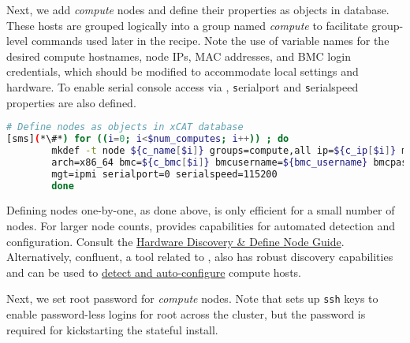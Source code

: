 
\noindent Next, we add {\em compute} nodes and define their properties as
objects in \xCAT{} database.
These hosts are grouped logically into a group named {\em
compute} to facilitate group-level commands used later in the recipe.  Note the
use of variable names for the desired compute hostnames, node IPs, MAC
addresses, and BMC login credentials, which should be modified to accommodate
local settings and hardware. To enable serial console access via  \xCAT{},
{\texttt serialport} and {\texttt serialspeed}
properties are also defined.

\begin{lstlisting}[language=bash,keywords={},upquote=true,basicstyle=\footnotesize\ttfamily,]
# Define nodes as objects in xCAT database
[sms](*\#*) for ((i=0; i<$num_computes; i++)) ; do
		mkdef -t node ${c_name[$i]} groups=compute,all ip=${c_ip[$i]} mac=${c_mac[$i]} netboot=xnba \
		arch=x86_64 bmc=${c_bmc[$i]} bmcusername=${bmc_username} bmcpassword=${bmc_password} \
		mgt=ipmi serialport=0 serialspeed=115200
        done
\end{lstlisting}

\begin{center}
  \begin{tcolorbox}[]
    \small
Defining nodes one-by-one, as done above, is only efficient
for a small number of nodes. For larger node counts,
\xCAT{} provides capabilities for automated detection and
configuration.
Consult the
\href{http://xcat-docs.readthedocs.io/en/stable/guides/admin-guides/manage_clusters/ppc64le/discovery/}{\color{blue}\xCAT{}
Hardware Discovery \& Define Node Guide}. Alternatively, confluent, a tool
related to \xCAT{}, also has robust discovery capabilities and can be used to
\href{https://hpc.lenovo.com/users/documentation/confluentdisco.html}{\color{blue}detect
and auto-configure} compute hosts.
\end{tcolorbox}
\end{center}

Next, we set root password for {\em compute} nodes. Note that \xCAT{} sets up
\texttt{ssh} keys to enable password-less logins for root across the cluster,
but the password is required for kickstarting the stateful install.

